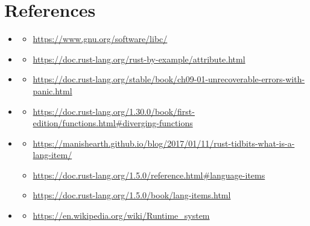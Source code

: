\documentclass{article}
\begin{document}
 \section{References}
 \begin{itemize}
    \item \hypertarget{ref:libc}{\textbf{\color{medium}{libc}}}
    \begin{itemize}
        \item \url{https://www.gnu.org/software/libc/}
    \end{itemize}
    \item \hypertarget{ref:attribute}{\textbf{\color{medium}{attribute}}}
    \begin{itemize}
        \item \url{https://doc.rust-lang.org/rust-by-example/attribute.html}
    \end{itemize}
    \item \hypertarget{ref:panic}{\textbf{\color{medium}{panic}}}
    \begin{itemize}
        \item \url{https://doc.rust-lang.org/stable/book/ch09-01-unrecoverable-errors-with-panic.html}
    \end{itemize}
    \item \hypertarget{ref:diverging-function}{\textbf{\color{medium}{Diverging Function}}}
    \begin{itemize}
        \item \url{https://doc.rust-lang.org/1.30.0/book/first-edition/functions.html#diverging-functions}
    \end{itemize}
    \item \hypertarget{ref:language-item}{\textbf{\color{medium}{Language Items}}}
    \begin{itemize}
        \item \url{https://manishearth.github.io/blog/2017/01/11/rust-tidbits-what-is-a-lang-item/}
        \item \url{https://doc.rust-lang.org/1.5.0/reference.html#language-items}
        \item \url{https://doc.rust-lang.org/1.5.0/book/lang-items.html}
    \end{itemize}
    \item \hypertarget{ref:runtime-environment}{\textbf{\color{medium}{Runtime Environment}}}
    \begin{itemize}
        \item \url{https://en.wikipedia.org/wiki/Runtime_system}
    \end{itemize}

\end{itemize}
\end{document}
